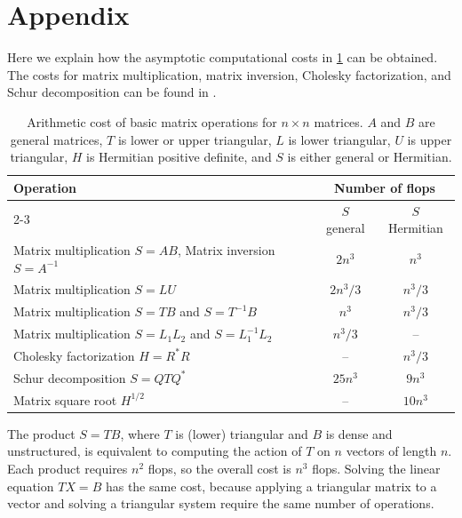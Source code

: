 \documentclass[DIV=14]{scrartcl}
\theoremstyle{thmstyletwo}
\theoremstyle{definition}
\numberwithin{equation}{section}
\begin{document}
{\section*{Appendix}
Here we explain how the asymptotic computational costs in \cref{tab:cost} can be obtained.
The costs for matrix multiplication, matrix inversion, Cholesky factorization, and Schur decomposition can be found in \cite[App.~C]{higham:book08}.

{\small
\begin{table}
    \centering
    \caption{
    Arithmetic cost of basic matrix operations for $n\times n$ matrices. $A$ and $B$ are general matrices, $T$ is lower or upper triangular, $L$ is lower triangular, $U$ is upper triangular,
    $H$ is Hermitian positive definite,
    and $S$ is either general or Hermitian.}
    \label{tab:cost}
    \begin{tabularx}{\linewidth}{Xcc}
    \toprule
    \multirow{2}[2]{*}{Operation} & \multicolumn{2}{c}{Number of flops}\\
    \cmidrule{2-3}
    & $S$ general & $S$ Hermitian \\
    \midrule
    Matrix multiplication $S=AB$, Matrix inversion $S=A^{-1}$     & $2n^3$ & $n^3$   \\
    Matrix multiplication $S=LU$     & $2n^3/3$ & $n^3/3$   \\
    Matrix multiplication $S=TB$ and  $S=T^{-1}B$ &  $n^3$ & $n^3/3$ \\
    Matrix multiplication $S=L_1L_2$ and $S=L_1^{-1}L_2$& $n^3/3$ & -- \\
    Cholesky factorization $H=R^*R$& -- & $n^3/3$\\
    Schur decomposition $S=QTQ^*$ & $25n^3$ & $9n^3$\\
    Matrix square root $H^{1/2}$ & -- & $10n^3$\\
    \bottomrule
    \end{tabularx}
\end{table}
}


The product $S=TB$, where $T$ is (lower) triangular and  $B$ is dense and unstructured, is equivalent to computing the action of $T$ on $n$ vectors of length $n$. Each product requires $n^2$ flops, so the overall cost is $n^3$ flops. Solving the linear equation $TX=B$ has the same cost, because applying a triangular matrix to a vector and solving a triangular system require the same number of operations.

}
\end{document}

